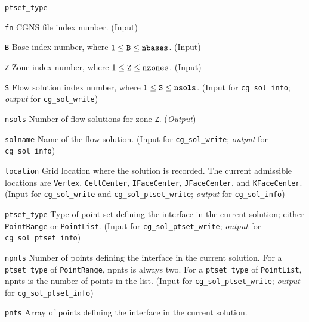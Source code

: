 \begin{Ventryi}{\texttt{ptset\_type}}\raggedright
\item [\texttt{fn}]
      CGNS file index number.
      (\textcolor{input}{Input})
\item [\texttt{B}]
      Base index number, where $1 \leq \text{\texttt{B}} \leq \text{\texttt{nbases}}$.
      (\textcolor{input}{Input})
\item [\texttt{Z}]
      Zone index number, where $1 \leq \text{\texttt{Z}} \leq \text{\texttt{nzones}}$.
      (\textcolor{input}{Input})
\item [\texttt{S}]
      Flow solution index number, where $1 \leq \text{\texttt{S}} \leq \text{\texttt{nsols}}$.
      (\textcolor{input}{Input} for \texttt{cg\_sol\_info};
      \textcolor{output}{\textit{output}} for \texttt{cg\_sol\_write})
\item [\texttt{nsols}]
      Number of flow solutions for zone \texttt{Z}.
      (\textcolor{output}{\textit{Output}})
\item [\texttt{solname}]
      Name of the flow solution.
      (\textcolor{input}{Input} for \texttt{cg\_sol\_write};
      \textcolor{output}{\textit{output}} for \texttt{cg\_sol\_info})
\item [\texttt{location}]
      Grid location where the solution is recorded.
      The current admissible locations are \texttt{Vertex},
      \texttt{CellCenter}, \texttt{IFaceCenter}, \texttt{JFaceCenter},
      and \texttt{KFaceCenter}.
      (\textcolor{input}{Input} for \texttt{cg\_sol\_write} and
      \texttt{cg\_sol\_ptset\_write};
      \textcolor{output}{\textit{output}} for \texttt{cg\_sol\_info})
\item [\texttt{ptset\_type}]
      Type of point set defining the interface in the current solution;
      either \texttt{PointRange} or \texttt{PointList}.
      (\textcolor{input}{Input} for \texttt{cg\_sol\_ptset\_write};
      \textcolor{output}{\textit{output}} for
      \texttt{cg\_sol\_ptset\_info})
\item [\texttt{npnts}]
      Number of points defining the interface in the current solution.
      For a \texttt{ptset\_type} of \texttt{PointRange}, npnts
      is always two. For a \texttt{ptset\_type} of \texttt{PointList},
      npnts is the number of points in the list. 
      (\textcolor{input}{Input} for \texttt{cg\_sol\_ptset\_write};
      \textcolor{output}{\textit{output}} for
      \texttt{cg\_sol\_ptset\_info})
\item [\texttt{pnts}]
      Array of points defining the interface in the current solution.

\end{Ventryi}
